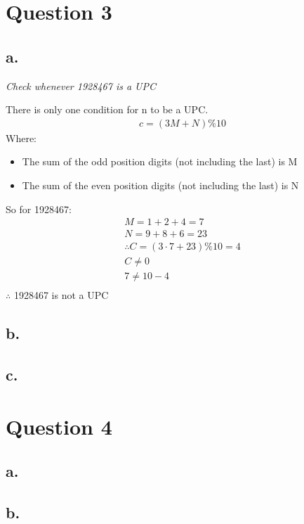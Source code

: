 \documentclass[a4paper, 12pt]{article}
\begin{document}
\section*{Question 3}
\subsection*{a.}
\begin{center}
    \textit{Check whenever 1928467 is a UPC} \\
\end{center}

There is only one condition for n to be a UPC.
\begin{align*}
    c = (3M + N)\%10
\end{align*}
Where:
\begin{itemize}
    \item The sum of the odd position digits (not including the last) is M 
    \item The sum of the even position digits (not including the last) is N 
\end{itemize}
So for 1928467:
\begin{align*}
    M = 1 + 2 + 4 = 7 \\
    N = 9 + 8 + 6 = 23  \\
    \therefore C = (3\cdot7 + 23)\%10 = 4 \\
    C \neq 0 \\
    7 \neq 10 - 4 \\
\end{align*}
$\therefore$ 1928467 is not a UPC 

\subsection*{b.}
\subsection*{c.}
\section*{Question 4}
\subsection*{a.}
\subsection*{b.}
\end{document}

